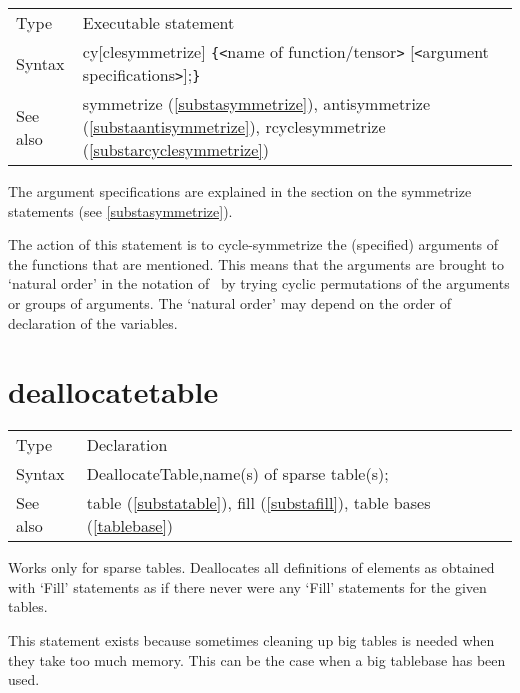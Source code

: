 \noindent \begin{tabular}{ll}
Type & Executable statement\\
Syntax & cy[clesymmetrize] \verb:{:{\tt<}name of function/tensor{\tt>}
         [{\tt<}argument specifications{\tt>}];\verb:}: \\
See also & symmetrize (\ref{substasymmetrize}), antisymmetrize 
(\ref{substaantisymmetrize}), rcyclesymmetrize (\ref{substarcyclesymmetrize})
\end{tabular} \vspace{4mm}

\noindent The argument specifications are explained 
in the section on the symmetrize statements (see \ref{substasymmetrize}). 
\medskip

\noindent The action of this statement is to cycle-symmetrize the (specified) 
arguments of the functions that are mentioned. This means that the 
arguments are brought to `natural order' in the notation of \FORM\ by trying 
cyclic permutations of the arguments or groups of arguments. The `natural 
order' may depend on the order of declaration of the variables. 
\vspace{10mm}

 
\section{deallocatetable}
\label{substadeallocatetable}

\noindent \begin{tabular}{ll}
Type & Declaration\\
Syntax & DeallocateTable,name(s) of sparse table(s);
\\ See also & table (\ref{substatable}), fill (\ref{substafill}),
   table bases (\ref{tablebase})
\end{tabular} \vspace{4mm}

\noindent Works only for sparse 
tables. Deallocates all definitions of elements as 
obtained with `Fill' statements as if there never were any 
`Fill' statements for the given tables.

This statement exists because sometimes cleaning up big tables is needed 
when they take too much memory. This can be the case when a big tablebase 
has been used. \vspace{10mm}

